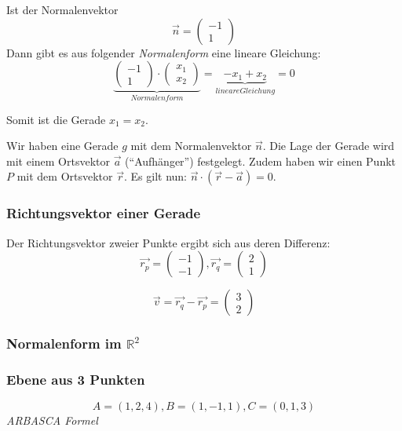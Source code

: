 Ist der Normalenvektor
\[ \vec{n} = \left( \begin{array}{r} -1 \\ 1 \end{array} \right) \]
Dann gibt es aus folgender \emph{Normalenform} eine lineare
Gleichung:
\[ \underbrace{\left( \begin{array}{r} -1 \\ 1 \end{array} \right) \cdot
  \left( \begin{array}{r} x_1 \\ x_2 \end{array} \right)}_{Normalenform}
  = \underbrace{-x_1 + x_2}_{lineare Gleichung} = 0 \]

Somit ist die Gerade $x_1 = x_2$.

Wir haben eine Gerade $g$ mit dem Normalenvektor $\vec{n}$. Die Lage der Gerade
wird mit einem Ortsvektor $\vec{a}$ ("`Aufhänger"') festgelegt. Zudem
haben wir einen Punkt $P$ mit dem Ortsvektor $\vec{r}$. Es gilt nun: $\vec{n}
\cdot (\vec{r} - \vec{a}) = 0$.

\subsubsection{Richtungsvektor einer Gerade}
Der Richtungsvektor zweier Punkte ergibt sich aus deren Differenz:
$$
  \vec{r_p} = 
  \begin{pmatrix}
    -1 \\
    -1
  \end{pmatrix},
  \vec{r_q} = 
  \begin{pmatrix}
    2 \\
    1
  \end{pmatrix}
$$

$$
  \vec{v} = \vec{r_q} - \vec{r_p} = 
  \begin{pmatrix}
    3 \\
    2
  \end{pmatrix}
$$

\subsubsection{Normalenform im $\mathbb{R}^2$}

\subsubsection{Ebene aus 3 Punkten}
$$
A = (1, 2, 4), B = (1, -1, 1), C=(0, 1, 3)
$$
\emph{ARBASCA Formel}

